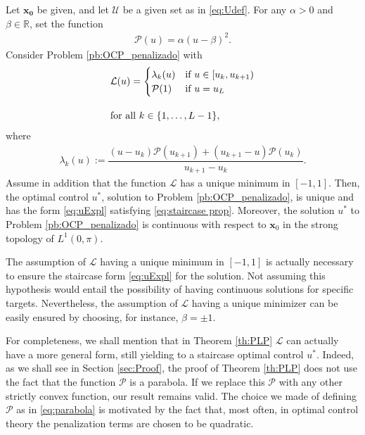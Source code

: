 \documentclass[9pt,shortpaper,twoside,web]{ieeecolor}
\begin{document}
\begin{theorem}\label{th:PLP}
	Let $\bm{x_0}$ be given, and let $\mathcal{U}$ be a given set as in \eqref{eq:Udef}. For any $\alpha>0$ and $\beta\in \mathbb{R}$, set the function
	\begin{align}\label{eq:parabola}
		\mathcal{P}(u) = \alpha (u-\beta)^2.
	\end{align}
	Consider Problem \ref{pb:OCP_penalizado} with 
	\begin{align}\label{eq:PLP}
		&\mathcal{L}(u) = \begin{cases}
			\lambda_k(u) & \text{if }  u \in [u_k,u_{k+1}) \\ \mathcal{P}(1) & \text{if } u = u_{L} 
		\end{cases} 
		\\[10pt]
		&\notag \text{for all } k \in \{1,\dots,L-1\}, 
	\end{align}
	where 
	\begin{align}\label{eq:lambda k}
		\lambda_k(u):= \dfrac{ (u-u_k)\mathcal{P}(u_{k+1}) + (u_{k+1}- u) \mathcal{P}(u_k)}{u_{k+1} - u_k}.
	\end{align}
	Assume in addition that the function $\mathcal{L}$ has a unique minimum in $[-1,1]$. Then, the optimal control $u^\ast$, solution to Problem \ref{pb:OCP_penalizado}, is unique and has the form \eqref{eq:uExpl} satisfying \eqref{eq:staircase prop}. Moreover, the solution $u^\ast$ to Problem \ref{pb:OCP_penalizado} is continuous with respect to $\bm{x}_0$ in the strong topology of $L^1(0,\pi)$.
\end{theorem}

The assumption of $\mathcal{L}$ having a unique minimum in $[-1,1]$ is actually necessary to ensure the staircase form \eqref{eq:uExpl} for the solution. Not assuming this hypothesis would entail the possibility of having continuous solutions for specific targets.
Nevertheless, the assumption of $\mathcal{L}$ having a unique minimizer can be easily ensured by choosing, for instance, $\beta=\pm 1$.

\begin{remark}
	For completeness, we shall mention that in Theorem \ref{th:PLP} $\mathcal L$ can actually have a more general form, still yielding to a staircase optimal control $u^\ast$. Indeed, as we shall see in Section \ref{sec:Proof}, the proof of Theorem \ref{th:PLP} does not use the fact that the function $\mathcal P$ is a parabola. If we replace this $\mathcal P$ with any other strictly convex function, our result remains valid. The choice we made of defining $\mathcal P$ as in \eqref{eq:parabola} is motivated by the fact that, most often, in optimal control theory the penalization terms are chosen to be quadratic.
\end{remark}
\end{document}
